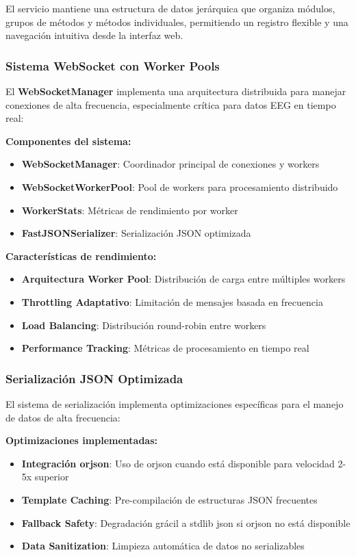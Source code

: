 El servicio mantiene una estructura de datos jerárquica que organiza módulos, grupos de métodos y métodos individuales, permitiendo un registro flexible y una navegación intuitiva desde la interfaz web.

\subsubsection{Sistema WebSocket con Worker Pools}

El \textbf{WebSocketManager} implementa una arquitectura distribuida para manejar conexiones de alta frecuencia, especialmente crítica para datos EEG en tiempo real:

\textbf{Componentes del sistema:}
\begin{itemize}
    \item \textbf{WebSocketManager}: Coordinador principal de conexiones y workers
    \item \textbf{WebSocketWorkerPool}: Pool de workers para procesamiento distribuido
    \item \textbf{WorkerStats}: Métricas de rendimiento por worker
    \item \textbf{FastJSONSerializer}: Serialización JSON optimizada
\end{itemize}

\textbf{Características de rendimiento:}
\begin{itemize}
    \item \textbf{Arquitectura Worker Pool}: Distribución de carga entre múltiples workers
    \item \textbf{Throttling Adaptativo}: Limitación de mensajes basada en frecuencia
    \item \textbf{Load Balancing}: Distribución round-robin entre workers
    \item \textbf{Performance Tracking}: Métricas de procesamiento en tiempo real
\end{itemize}

\subsubsection{Serialización JSON Optimizada}

El sistema de serialización implementa optimizaciones específicas para el manejo de datos de alta frecuencia:

\textbf{Optimizaciones implementadas:}
\begin{itemize}
    \item \textbf{Integración orjson}: Uso de orjson cuando está disponible para velocidad 2-5x superior
    \item \textbf{Template Caching}: Pre-compilación de estructuras JSON frecuentes
    \item \textbf{Fallback Safety}: Degradación grácil a stdlib json si orjson no está disponible
    \item \textbf{Data Sanitization}: Limpieza automática de datos no serializables
\end{itemize}


